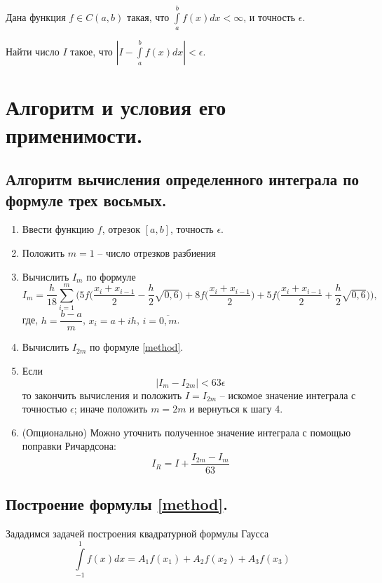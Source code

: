 \documentclass[a4paper, 12pt]{article}
\begin{document}
	Дана функция $f\in C(a,b)$ такая, что $\int\limits_a^bf(x)dx<\infty$, и точность $\epsilon$. 
	
	Найти число $I$ такое, что $|I-\int\limits_a^bf(x)dx|<\epsilon$.
	
	\section{Алгоритм и условия его применимости.}
	
	\subsection{Алгоритм вычисления определенного интеграла по формуле трех восьмых.}
	\label{alghorithm}
	
	\begin{enumerate}
		\item Ввести функцию $f$, отрезок $[a,b]$, точность $\epsilon$.
		\item Положить $m=1$ -- число отрезков разбиения
		\item Вычислить $I_m$ по формуле
		\begin{equation} \label{method}
			I_m=\frac{h}{18}\sum\limits_{i=1}^{m}\bigg(5f\bigg(\frac{x_i+x_{i-1}}{2}-\frac{h}{2}\sqrt{0,6}\bigg)+8f\bigg(\frac{x_i+x_{i-1}}{2}\bigg)+5f\bigg(\frac{x_i+x_{i-1}}{2}+\frac{h}{2}\sqrt{0,6}\bigg)\bigg),
		\end{equation}
		где, $h=\dfrac{b-a}{m}$, $x_i=a+ih$, $i=\overline{0,m}$.
		\item Вычислить $I_{2m}$ по формуле \eqref{method}.
		\item Если
		\begin{equation}
			|I_m-I_{2m}|<63\epsilon
		\end{equation}
		то закончить вычисления и положить $I=I_{2m}$ -- искомое значение интеграла с точностью $\epsilon$; иначе положить $m=2m$ и вернуться к шагу 4.
		\item (Опционально) Можно уточнить полученное значение интеграла с помощью поправки Ричардсона:
		\begin{equation}
			I_R=I+\frac{I_{2m}-I_m}{63}
		\end{equation}
	\end{enumerate}

	\subsection{Построение формулы \eqref{method}.}
	
	Зададимся задачей построения квадратурной формулы Гаусса
	\begin{equation} \label{generalformula}
		\int\limits_{-1}^{1}f(x)dx=A_1f(x_1)+A_2f(x_2)+A_3f(x_3)
	\end{equation}
	
\end{document}
